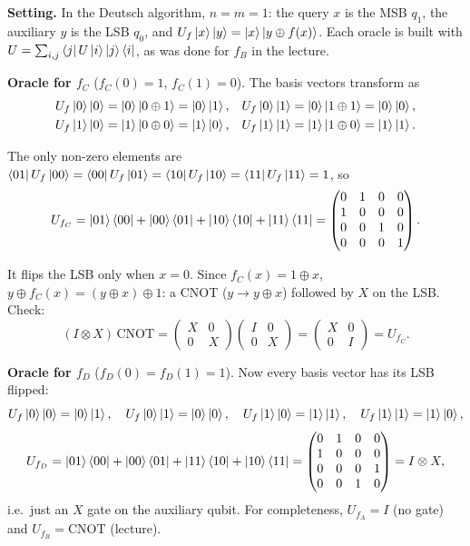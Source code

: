 \documentclass[a4paper, 10pt]{article}
\begin{document}
\begin{solution}
	\noindent \textbf{Setting.} In the Deutsch algorithm, \( n = m = 1 \): the query \( x \) is the MSB \( q_1 \), the auxiliary \( y \) is the LSB \( q_0 \), and \( U_f\ket{x}\ket{y} = \ket{x}\ket{y \oplus f(x)} \).
	Each oracle is built with \( U = \sum_{i, j} \bra{j}U\ket{i}\ket{j}\bra{i} \), as was done for \( f_B \) in the lecture.

	\myspace

	\noindent \textbf{Oracle for \( f_C \)} (\( f_C(0) = 1 \), \( f_C(1) = 0 \)). The basis vectors transform as
	\begin{align*}
		U_f\ket{0}\ket{0} & = \ket{0}\ket{0 \oplus 1} = \ket{0}\ket{1}, & U_f\ket{0}\ket{1} & = \ket{0}\ket{1 \oplus 1} = \ket{0}\ket{0}, \\
		U_f\ket{1}\ket{0} & = \ket{1}\ket{0 \oplus 0} = \ket{1}\ket{0}, & U_f\ket{1}\ket{1} & = \ket{1}\ket{1 \oplus 0} = \ket{1}\ket{1}.
	\end{align*}

	The only non-zero elements are \( \bra{01}U_f\ket{00} = \bra{00}U_f\ket{01} = \bra{10}U_f\ket{10} = \bra{11}U_f\ket{11} = 1 \), so
	\[
		U_{f_C} = \ket{01}\bra{00} + \ket{00}\bra{01} + \ket{10}\bra{10} + \ket{11}\bra{11}
		= \begin{pmatrix}
			0 & 1 & 0 & 0 \\
			1 & 0 & 0 & 0 \\
			0 & 0 & 1 & 0 \\
			0 & 0 & 0 & 1
		\end{pmatrix}.
	\]

	It flips the LSB only when \( x = 0 \). Since \( f_C(x) = 1 \oplus x \), \( y \oplus f_C(x) = (y \oplus x) \oplus 1 \): a CNOT (\( y \to y \oplus x \)) followed by \( X \) on the LSB. Check:
	\[
		(I \otimes X)\,\mathrm{CNOT}
		= \begin{pmatrix} X & 0 \\ 0 & X \end{pmatrix}\begin{pmatrix} I & 0 \\ 0 & X \end{pmatrix}
		= \begin{pmatrix} X & 0 \\ 0 & I \end{pmatrix} = U_{f_C}.
	\]

	\noindent \textbf{Oracle for \( f_D \)} (\( f_D(0) = f_D(1) = 1 \)). Now every basis vector has its LSB flipped:
	\[
		U_f\ket{0}\ket{0} = \ket{0}\ket{1}, \quad U_f\ket{0}\ket{1} = \ket{0}\ket{0}, \quad U_f\ket{1}\ket{0} = \ket{1}\ket{1}, \quad U_f\ket{1}\ket{1} = \ket{1}\ket{0},
	\]
	\[
		U_{f_D} = \ket{01}\bra{00} + \ket{00}\bra{01} + \ket{11}\bra{10} + \ket{10}\bra{11}
		= \begin{pmatrix}
			0 & 1 & 0 & 0 \\
			1 & 0 & 0 & 0 \\
			0 & 0 & 0 & 1 \\
			0 & 0 & 1 & 0
		\end{pmatrix} = I \otimes X ,
	\]
	i.e.\ just an \( X \) gate on the auxiliary qubit. For completeness, \( U_{f_A} = I \) (no gate) and \( U_{f_B} = \mathrm{CNOT} \) (lecture).


\end{solution}
\end{document}
